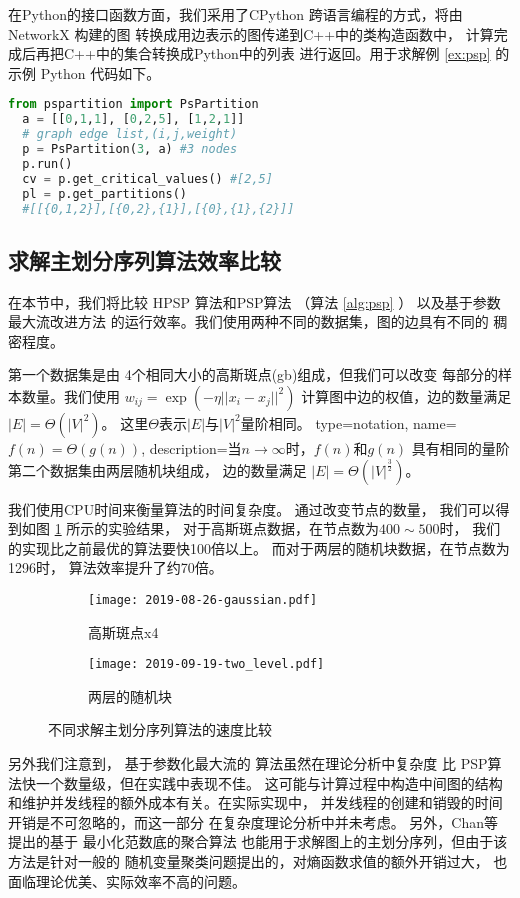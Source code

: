 在Python的接口函数方面，我们采用了CPython
跨语言编程的方式，将由 NetworkX \cite{SciPyProceedings_11} 构建的图
转换成用边表示的图传递到C++中的类构造函数中，
计算完成后再把C++中的集合转换成Python中的列表
进行返回。用于求解例 \ref{ex:psp} 的示例 Python 代码如下。
\begin{lstlisting}[language=Python]
  from pspartition import PsPartition
  a = [[0,1,1], [0,2,5], [1,2,1]] 
  # graph edge list,(i,j,weight)
  p = PsPartition(3, a) #3 nodes
  p.run()
  cv = p.get_critical_values() #[2,5]
  pl = p.get_partitions()
  #[[{0,1,2}],[{0,2},{1}],[{0},{1},{2}]]
\end{lstlisting}

\subsection{求解主划分序列算法效率比较}
在本节中，我们将比较 HPSP 算法和PSP算法
（算法 \ref{alg:psp} ）
以及基于参数最大流改进方法\cite{kolmogorov}
的运行效率。我们使用两种不同的数据集，图的边具有不同的
稠密程度。

第一个数据集是由
4个相同大小的高斯斑点(\glsdesc{gb})组成，但我们可以改变
每部分的样本数量。我们使用
  $w_{ij}=\exp(-\eta ||x_i-x_j||^2)$
计算图中边的权值，边的数量满足 $|E|=\Theta(|V|^2)$。
这里$\Theta$表示$|E|$与$|V|^2$量阶相同。
{
  type=notation,
  name={$f(n)=\Theta(g(n))$},
  description={当$n\to \infty$时，$f(n)$和$g(n)$ 具有相同的量阶}
}
第二个数据集由两层随机块组成，
边的数量满足 $|E|=\Theta(|V|^{\frac{3}{2}})$。

我们使用CPU时间来衡量算法的时间复杂度。
通过改变节点的数量，
我们可以得到如图 \ref{fig:esc} 所示的实验结果，
对于高斯斑点数据，在节点数为$400\sim 500$时，
我们的实现比之前最优的算法要快100倍以上。
而对于两层的随机块数据，在节点数为1296时，
算法效率提升了约70倍。
\begin{figure}
	\centering
	\begin{subfigure}{0.45\textwidth}
		\texttt{[image: 2019-08-26-gaussian.pdf]}
    \caption{高斯斑点x4}
	\end{subfigure}
	\begin{subfigure}{0.45\textwidth}
		\texttt{[image: 2019-09-19-two\_level.pdf]}
    \caption{两层的随机块}
	\end{subfigure}
	\caption{
  不同求解主划分序列算法的速度比较}\label{fig:esc}
\end{figure}

另外我们注意到，
基于参数化最大流的
算法\citep{kolmogorov}虽然在理论分析中复杂度
比 PSP算法快一个数量级，但在实践中表现不佳。
这可能与计算过程中构造中间图的结构
和维护并发线程的额外成本有关。在实际实现中，
并发线程的创建和销毁的时间开销是不可忽略的，而这一部分
在复杂度理论分析中并未考虑。
另外，Chan等\cite{chan2020agglomerative} 提出的基于 最小化范数底的聚合算法
也能用于求解图上的主划分序列，但由于该方法是针对一般的
随机变量聚类问题提出的，对熵函数求值的额外开销过大，
也面临理论优美、实际效率不高的问题。

